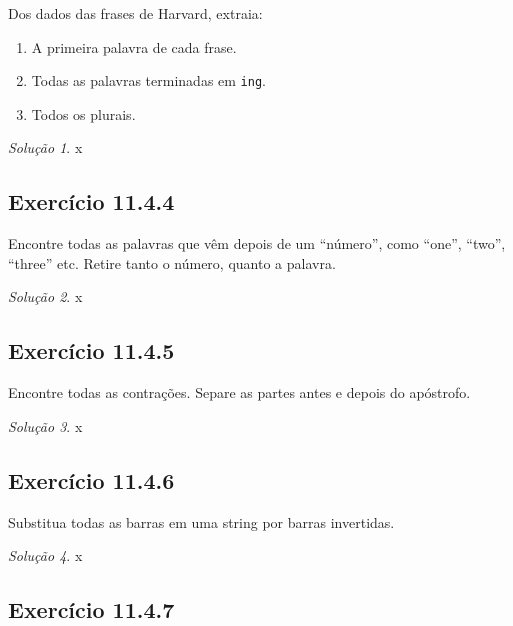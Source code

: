 \documentclass[
]{latex/krantz}
\providecommand{\tightlist}{%
  \setlength{\itemsep}{0pt}\setlength{\parskip}{0pt}}
\theoremstyle{definition}
\theoremstyle{definition}
\theoremstyle{definition}
\theoremstyle{definition}
\theoremstyle{remark}
\newtheorem*{solution}{Solução}
\begin{document}
Dos dados das frases de Harvard, extraia:

\begin{enumerate}
\def\labelenumi{\alph{enumi}.}
\tightlist
\item
  A primeira palavra de cada frase.
\item
  Todas as palavras terminadas em \texttt{ing}.
\item
  Todos os plurais.
\end{enumerate}

\begin{solution}
x
\end{solution}

\hypertarget{exr11-4-4}{%
\subsection*{Exercício 11.4.4}\label{exr11-4-4}}

Encontre todas as palavras que vêm depois de um ``número'', como ``one'', ``two'', ``three'' etc. Retire tanto o número, quanto a palavra.

\begin{solution}
x
\end{solution}

\hypertarget{exr11-4-5}{%
\subsection*{Exercício 11.4.5}\label{exr11-4-5}}

Encontre todas as contrações. Separe as partes antes e depois do apóstrofo.

\begin{solution}
x
\end{solution}

\hypertarget{exr11-4-6}{%
\subsection*{Exercício 11.4.6}\label{exr11-4-6}}

Substitua todas as barras em uma string por barras invertidas.

\begin{solution}
x
\end{solution}

\hypertarget{exr11-4-7}{%
\subsection*{Exercício 11.4.7}\label{exr11-4-7}}
\end{document}
